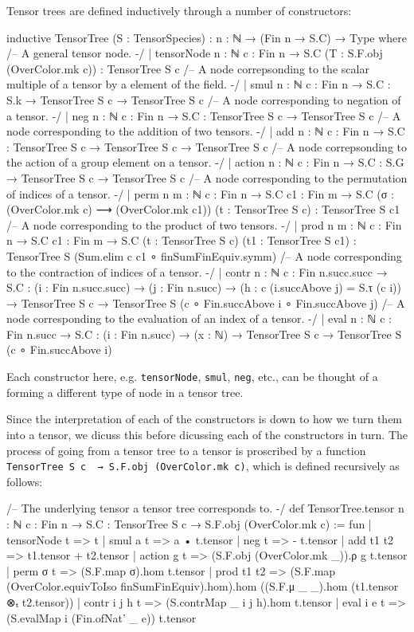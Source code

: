 \documentclass[a4paper, 11pt]{article}
\begin{document}
Tensor trees are defined inductively through a number of constructors: 
\begin{codeLong}
inductive TensorTree (S : TensorSpecies) : {n : ℕ} → (Fin n → S.C) → Type where
  /-- A general tensor node. -/
  | tensorNode {n : ℕ} {c : Fin n → S.C} (T : S.F.obj (OverColor.mk c)) : TensorTree S c
  /-- A node correpsonding to the scalar multiple of a tensor by a element of the field. -/
  | smul {n : ℕ} {c : Fin n → S.C} : S.k → TensorTree S c → TensorTree S c
  /-- A node corresponding to negation of a tensor. -/
  | neg {n : ℕ} {c : Fin n → S.C} : TensorTree S c → TensorTree S c
  /-- A node corresponding to the addition of two tensors. -/
  | add {n : ℕ} {c : Fin n → S.C} : TensorTree S c → TensorTree S c → TensorTree S c
  /-- A node correpsonding to the action of a group element on a tensor. -/
  | action {n : ℕ} {c : Fin n → S.C} : S.G → TensorTree S c → TensorTree S c
  /-- A node corresponding to the permutation of indices of a tensor. -/
  | perm {n m : ℕ} {c : Fin n → S.C} {c1 : Fin m → S.C}
      (σ : (OverColor.mk c) ⟶ (OverColor.mk c1)) (t : TensorTree S c) : TensorTree S c1
  /-- A node corresponding to the product of two tensors. -/
  | prod {n m : ℕ} {c : Fin n → S.C} {c1 : Fin m → S.C}
    (t : TensorTree S c) (t1 : TensorTree S c1) : TensorTree S (Sum.elim c c1 ∘ finSumFinEquiv.symm)
  /-- A node corresponding to the contraction of indices of a tensor. -/
  | contr {n : ℕ} {c : Fin n.succ.succ → S.C} : (i : Fin n.succ.succ) →
    (j : Fin n.succ) → (h : c (i.succAbove j) = S.τ (c i)) → TensorTree S c →
    TensorTree S (c ∘ Fin.succAbove i ∘ Fin.succAbove j)
  /-- A node corresponding to the evaluation of an index of a tensor. -/
  | eval {n : ℕ} {c : Fin n.succ → S.C} : (i : Fin n.succ) → (x : ℕ) → TensorTree S c →
    TensorTree S (c ∘ Fin.succAbove i)
\end{codeLong}
Each constructor here, e.g. \lstinline|tensorNode|, \lstinline|smul|, \lstinline|neg|, etc., can 
be thought of a forming a different type of node in a tensor tree.

Since the interpretation of each of the constructors is down to how we turn them into a tensor,
we dicuss this before dicussing each of the constructors in turn. The process 
of going from a tensor tree to a tensor is proscribed by a function
\lstinline|TensorTree S c  → S.F.obj (OverColor.mk c)|, which is defined recursively as follows: 
\begin{code}
/-- The underlying tensor a tensor tree corresponds to. -/
def TensorTree.tensor {n : ℕ} {c : Fin n → S.C} : TensorTree S c → S.F.obj (OverColor.mk c) := fun
  | tensorNode t => t
  | smul a t => a • t.tensor
  | neg t => - t.tensor
  | add t1 t2 => t1.tensor + t2.tensor
  | action g t => (S.F.obj (OverColor.mk _)).ρ g t.tensor
  | perm σ t => (S.F.map σ).hom t.tensor
  | prod t1 t2 => (S.F.map (OverColor.equivToIso finSumFinEquiv).hom).hom
    ((S.F.μ _ _).hom (t1.tensor ⊗ₜ t2.tensor))
  | contr i j h t => (S.contrMap _ i j h).hom t.tensor
  | eval i e t => (S.evalMap i (Fin.ofNat' _ e)) t.tensor
\end{code}
\end{document}
